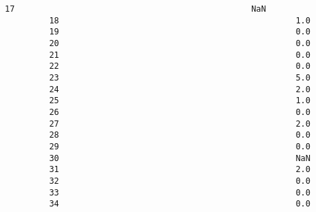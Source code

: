 \documentclass[11pt]{article}
\begin{document}
\begin{Verbatim}[commandchars=\\\{\}]
         17                                                NaN                                                                                      
         18                                                1.0                                                                                      
         19                                                0.0                                                                                      
         20                                                0.0                                                                                      
         21                                                0.0                                                                                      
         22                                                0.0                                                                                      
         23                                                5.0                                                                                      
         24                                                2.0                                                                                      
         25                                                1.0                                                                                      
         26                                                0.0                                                                                      
         27                                                2.0                                                                                      
         28                                                0.0                                                                                      
         29                                                0.0                                                                                      
         30                                                NaN                                                                                      
         31                                                2.0                                                                                      
         32                                                0.0                                                                                      
         33                                                0.0                                                                                      
         34                                                0.0                                                                                      

\end{Verbatim}
\end{document}
